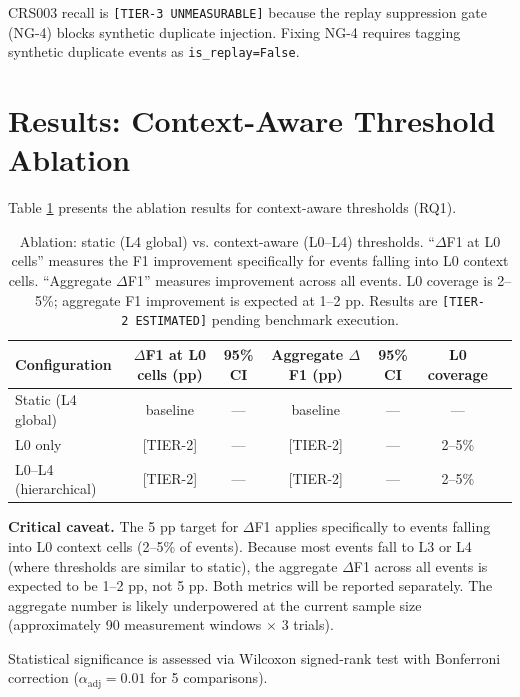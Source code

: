 CRS003 recall is \texttt{[TIER-3\ UNMEASURABLE]} because the replay
suppression gate (NG-4) blocks synthetic duplicate injection. Fixing NG-4
requires tagging synthetic duplicate events as \texttt{is\_replay=False}.

\section{Results: Context-Aware Threshold Ablation}
\label{sec:results-threshold-abl}

Table \ref{tab:results-threshold-abl} presents the ablation results for
context-aware thresholds (RQ1).

\begin{table}[htbp]
  \centering
  \caption{Ablation: static (L4 global) vs. context-aware (L0--L4) thresholds.
    ``$\Delta$F1 at L0 cells'' measures the F1 improvement specifically for
    events falling into L0 context cells.
    ``Aggregate $\Delta$F1'' measures improvement across all events.
    L0 coverage is 2--5\%; aggregate F1 improvement is expected at 1--2 pp.
    Results are \texttt{[TIER-2\ ESTIMATED]} pending benchmark execution.}
  \label{tab:results-threshold-abl}
  \begin{tabular}{lcccccc}
    \toprule
    Configuration & $\Delta$F1 at L0 cells (pp) & 95\% CI
    & Aggregate $\Delta$F1 (pp) & 95\% CI & L0 coverage \\
    \midrule
    Static (L4 global)   & baseline & — & baseline & — & — \\
    L0 only              & [TIER-2] & — & [TIER-2] & — & 2--5\% \\
    L0--L4 (hierarchical)& [TIER-2] & — & [TIER-2] & — & 2--5\% \\
    \bottomrule
  \end{tabular}
\end{table}

\textbf{Critical caveat.} The 5 pp target for $\Delta$F1 applies specifically
to events falling into L0 context cells (2--5\% of events). Because most
events fall to L3 or L4 (where thresholds are similar to static), the
aggregate $\Delta$F1 across all events is expected to be 1--2 pp, not 5 pp.
Both metrics will be reported separately. The aggregate number is likely
underpowered at the current sample size (approximately 90 measurement windows
$\times$ 3 trials).

Statistical significance is assessed via Wilcoxon signed-rank test with
Bonferroni correction ($\alpha_{\text{adj}} = 0.01$ for 5 comparisons).

